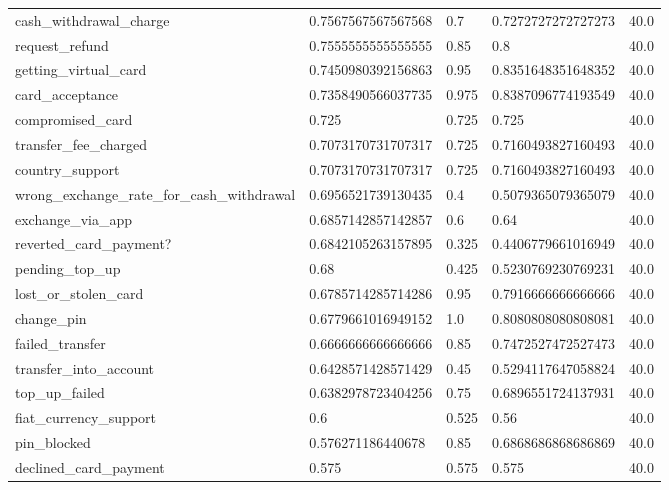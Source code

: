 \begin{table}[!ht]
\begin{tabularx}{\textwidth}{X l l l l}
cash\_withdrawal\_charge & \num{0.7567567567567568} & \num{0.7} & \num{0.7272727272727273} & \num{40.0} \\
request\_refund & \num{0.7555555555555555} & \num{0.85} & \num{0.8} & \num{40.0} \\
getting\_virtual\_card & \num{0.7450980392156863} & \num{0.95} & \num{0.8351648351648352} & \num{40.0} \\
card\_acceptance & \num{0.7358490566037735} & \num{0.975} & \num{0.8387096774193549} & \num{40.0} \\
compromised\_card & \num{0.725} & \num{0.725} & \num{0.725} & \num{40.0} \\
transfer\_fee\_charged & \num{0.7073170731707317} & \num{0.725} & \num{0.7160493827160493} & \num{40.0} \\
country\_support & \num{0.7073170731707317} & \num{0.725} & \num{0.7160493827160493} & \num{40.0} \\
wrong\_exchange\_rate\_for\_cash\_withdrawal & \num{0.6956521739130435} & \num{0.4} & \num{0.5079365079365079} & \num{40.0} \\
exchange\_via\_app & \num{0.6857142857142857} & \num{0.6} & \num{0.64} & \num{40.0} \\
reverted\_card\_payment? & \num{0.6842105263157895} & \num{0.325} & \num{0.4406779661016949} & \num{40.0} \\
pending\_top\_up & \num{0.68} & \num{0.425} & \num{0.5230769230769231} & \num{40.0} \\
lost\_or\_stolen\_card & \num{0.6785714285714286} & \num{0.95} & \num{0.7916666666666666} & \num{40.0} \\
change\_pin & \num{0.6779661016949152} & \num{1.0} & \num{0.8080808080808081} & \num{40.0} \\
failed\_transfer & \num{0.6666666666666666} & \num{0.85} & \num{0.7472527472527473} & \num{40.0} \\
transfer\_into\_account & \num{0.6428571428571429} & \num{0.45} & \num{0.5294117647058824} & \num{40.0} \\
top\_up\_failed & \num{0.6382978723404256} & \num{0.75} & \num{0.6896551724137931} & \num{40.0} \\
fiat\_currency\_support & \num{0.6} & \num{0.525} & \num{0.56} & \num{40.0} \\
pin\_blocked & \num{0.576271186440678} & \num{0.85} & \num{0.6868686868686869} & \num{40.0} \\
declined\_card\_payment & \num{0.575} & \num{0.575} & \num{0.575} & \num{40.0} \\

\end{tabularx}
\end{table}
